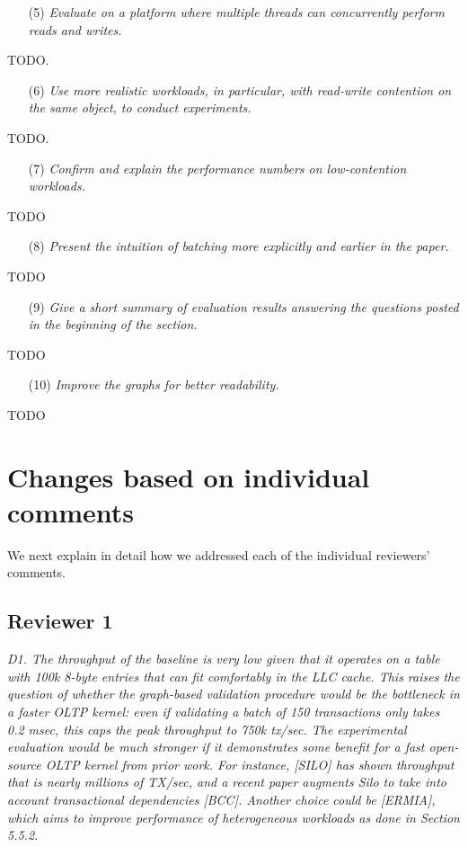 \documentclass{article}
\begin{document}
\begin{itemize}
\item[(5)]  \emph{Evaluate on a platform where multiple threads can concurrently perform reads and writes.}
\end{itemize}
TODO.

\begin{itemize}
\item[(6)] \emph{Use more realistic workloads, in particular, with read-write contention on the same object, to conduct experiments.}
\end{itemize}
TODO.

\begin{itemize}
\item[(7)] \emph{Confirm and explain the performance numbers on low-contention workloads.}
\end{itemize}
TODO

\begin{itemize}
	\item[(8)] \emph{Present the intuition of batching more explicitly and earlier in the paper. }
\end{itemize}
TODO

\begin{itemize}
	\item[(9)] \emph{Give a short summary of evaluation results answering the questions posted in the beginning of the section.}
\end{itemize}
TODO

\begin{itemize}
	\item[(10)] \emph{Improve the graphs for better readability.}
\end{itemize}
TODO

\section{Changes based on individual comments}

We next explain in detail how we addressed each of the individual reviewers' comments.

\subsection{Reviewer 1}

\emph{D1. The throughput of the baseline is very low given that it operates on a table with 100k 8-byte entries that can fit comfortably in the LLC cache. This raises the question of whether the graph-based validation procedure would be the bottleneck in a faster OLTP kernel: even if validating a batch of 150 transactions only takes 0.2 msec, this caps the peak throughput to 750k tx/sec. The experimental evaluation would be much stronger if it demonstrates some benefit for a fast open-source OLTP kernel from prior work. For instance, [SILO] has shown throughput that is nearly millions of TX/sec, and a recent paper augments Silo to take into account transactional dependencies [BCC]. Another choice could be [ERMIA], which aims to improve performance of heterogeneous workloads as done in Section 5.5.2.}
\end{document}
